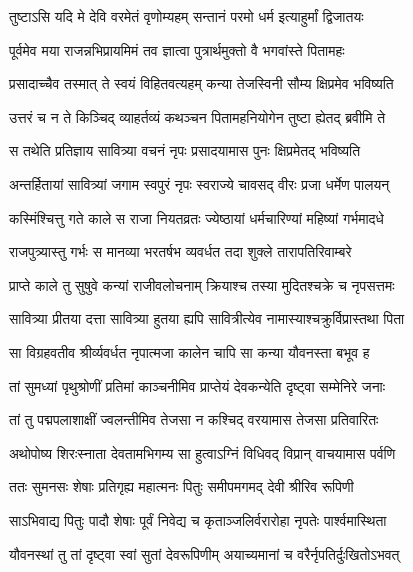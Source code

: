 \begin{center}
\twolineshloka
{तुष्टाऽसि यदि मे देवि वरमेतं वृणोम्यहम्}
{सन्तानं परमो धर्म इत्याहुर्मां द्विजातयः} %


\twolineshloka
{पूर्वमेव मया राजन्नभिप्रायमिमं तव}
{ज्ञात्वा पुत्रार्थमुक्तो वै भगवांस्ते पितामहः} %

\twolineshloka
{प्रसादाच्चैव तस्मात् ते स्वयं विहितवत्यहम्}
{कन्या तेजस्विनी सौम्य क्षिप्रमेव भविष्यति} %

\twolineshloka
{उत्तरं च न ते किञ्चिद् व्याहर्तव्यं कथञ्चन}
{पितामहनियोगेन तुष्टा ह्येतद् ब्रवीमि ते} %

\twolineshloka
{स तथेति प्रतिज्ञाय सावित्र्या वचनं नृपः}
{प्रसादयामास पुनः क्षिप्रमेतद् भविष्यति} %

\twolineshloka
{अन्तर्हितायां सावित्र्यां जगाम स्वपुरं नृपः}
{स्वराज्ये चावसद् वीरः प्रजा धर्मेण पालयन्} %

\twolineshloka
{कस्मिंश्चित्तु गते काले स राजा नियतव्रतः}
{ज्येष्ठायां धर्मचारिण्यां महिष्यां गर्भमादधे} %

\twolineshloka
{राजपुत्र्यास्तु गर्भः स मानव्या भरतर्षभ}
{व्यवर्धत तदा शुक्ले तारापतिरिवाम्बरे} %

\twolineshloka
{प्राप्ते काले तु सुषुवे कन्यां राजीवलोचनाम्}
{क्रियाश्च तस्या मुदितश्चक्रे च नृपसत्तमः} %

\twolineshloka
{सावित्र्या प्रीतया दत्ता सावित्र्या हुतया ह्यपि}
{सावित्रीत्येव नामास्याश्चक्रुर्विप्रास्तथा पिता} %

\twolineshloka
{सा विग्रहवतीव श्रीर्व्यवर्धत नृपात्मजा}
{कालेन चापि सा कन्या यौवनस्ता बभूव ह} %

\twolineshloka
{तां सुमध्यां पृथुश्रोणीं प्रतिमां काञ्चनीमिव}
{प्राप्तेयं देवकन्येति दृष्ट्वा सम्मेनिरे जनाः} %

\twolineshloka
{तां तु पद्मपलाशाक्षीं ज्वलन्तीमिव तेजसा}
{न कश्चिद् वरयामास तेजसा प्रतिवारितः} %

\twolineshloka
{अथोपोष्य शिरःस्नाता देवतामभिगम्य सा}
{हुत्वाऽग्निं विधिवद् विप्रान् वाचयामास पर्वणि} %

\twolineshloka
{ततः सुमनसः शेषाः प्रतिगृह्य महात्मनः}
{पितुः समीपमगमद् देवी श्रीरिव रूपिणी} %

\twolineshloka
{साऽभिवाद्य पितुः पादौ शेषाः पूर्वं निवेद्य च}
{कृताञ्जलिर्वरारोहा नृपतेः पार्श्वमास्थिता} %

\twolineshloka
{यौवनस्थां तु तां दृष्ट्वा स्वां सुतां देवरूपिणीम्}
{अयाच्यमानां च वरैर्नृपतिर्दुःखितोऽभवत्} %



\end{center}
